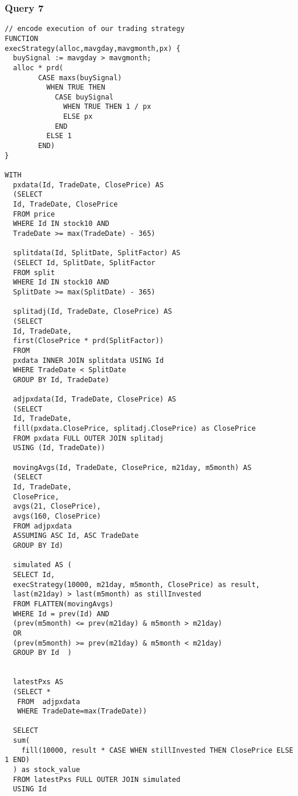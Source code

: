 \documentclass{acm_proc_article-sp}
\begin{document}
\subsubsection{Query 7}
\begin{lstlisting}
// encode execution of our trading strategy
FUNCTION 
execStrategy(alloc,mavgday,mavgmonth,px) {
  buySignal := mavgday > mavgmonth;
  alloc * prd(
        CASE maxs(buySignal)
          WHEN TRUE THEN
            CASE buySignal
              WHEN TRUE THEN 1 / px
              ELSE px 
            END
          ELSE 1 
        END)
}

WITH
  pxdata(Id, TradeDate, ClosePrice) AS
  (SELECT 
  Id, TradeDate, ClosePrice 
  FROM price 
  WHERE Id IN stock10 AND 
  TradeDate >= max(TradeDate) - 365)
 
  splitdata(Id, SplitDate, SplitFactor) AS 
  (SELECT Id, SplitDate, SplitFactor 
  FROM split
  WHERE Id IN stock10 AND 
  SplitDate >= max(SplitDate) - 365)
  
  splitadj(Id, TradeDate, ClosePrice) AS
  (SELECT 
  Id, TradeDate,
  first(ClosePrice * prd(SplitFactor))
  FROM 
  pxdata INNER JOIN splitdata USING Id 
  WHERE TradeDate < SplitDate
  GROUP BY Id, TradeDate)
    
  adjpxdata(Id, TradeDate, ClosePrice) AS 
  (SELECT 
  Id, TradeDate, 
  fill(pxdata.ClosePrice, splitadj.ClosePrice) as ClosePrice
  FROM pxdata FULL OUTER JOIN splitadj 
  USING (Id, TradeDate))
      
  movingAvgs(Id, TradeDate, ClosePrice, m21day, m5month) AS 
  (SELECT 
  Id, TradeDate, 
  ClosePrice, 
  avgs(21, ClosePrice),
  avgs(160, ClosePrice)
  FROM adjpxdata 
  ASSUMING ASC Id, ASC TradeDate 
  GROUP BY Id)
  
  simulated AS (
  SELECT Id, 
  execStrategy(10000, m21day, m5month, ClosePrice) as result,
  last(m21day) > last(m5month) as stillInvested
  FROM FLATTEN(movingAvgs)
  WHERE Id = prev(Id) AND
  (prev(m5month) <= prev(m21day) & m5month > m21day)  
  OR 
  (prev(m5month) >= prev(m21day) & m5month < m21day)
  GROUP BY Id  )
  
  
  latestPxs AS 
  (SELECT * 
   FROM  adjpxdata
   WHERE TradeDate=max(TradeDate))  
    
  SELECT 
  sum(
    fill(10000, result * CASE WHEN stillInvested THEN ClosePrice ELSE 1 END)
  ) as stock_value
  FROM latestPxs FULL OUTER JOIN simulated 
  USING Id
\end{lstlisting}
\end{document}
